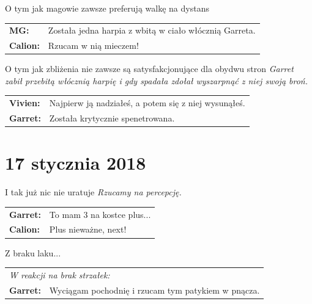\documentclass[10pt,twoside,twocolumn]{book}
\begin{document}
\begin{rpg-quotebox}{O tym jak magowie zawsze preferują walkę na dystans}
   \begin{tabularx}{\columnwidth}{lX}
      \textbf{MG:} & Została jedna harpia z wbitą w ciało włócznią Garreta.\\
      \textbf{Calion:} & Rzucam w nią mieczem!\\
   \end{tabularx}
\end{rpg-quotebox}

\begin{rpg-quotebox}{O tym jak zbliżenia nie zawsze są satysfakcjonujące dla obydwu stron}
   \textit{Garret zabił przebitą włócznią harpię i gdy spadała zdołał wyszarpnąć z niej swoją broń.}\\

   \begin{tabularx}{\columnwidth}{lX}
      \textbf{Vivien:} & Najpierw ją nadziałeś, a potem się z niej wysunąłeś.\\
      \textbf{Garret:} & Została krytycznie spenetrowana.\\
   \end{tabularx}
\end{rpg-quotebox}

\section*{17 stycznia 2018}

\begin{rpg-quotebox}{I tak już nic nie uratuje}
   \textit{Rzucamy na percepcję.}\\

   \begin{tabularx}{\columnwidth}{lX}
      \textbf{Garret:} & To mam 3 na kostce plus...\\
      \textbf{Calion:} & Plus nieważne, next!\\
   \end{tabularx}
\end{rpg-quotebox}

\begin{rpg-quotebox}{Z braku laku...}
   \begin{tabularx}{\columnwidth}{lX}
      \multicolumn{2}{l}{\textit{W reakcji na brak strzałek:}}\\
      \textbf{Garret:} & Wyciągam pochodnię i rzucam tym patykiem w pnącza.\\
   \end{tabularx}
\end{rpg-quotebox}
\end{document}
